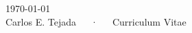 \documentclass[11pt, a4paper]{awesome-cv}
\begin{document}
  \makecvheader
  \makecvfooter
    {\today\\}
    {Carlos E. Tejada~~~·~~~Curriculum Vitae}
    {\thepage}

  
  
  
  
  
  
  
\end{document}
